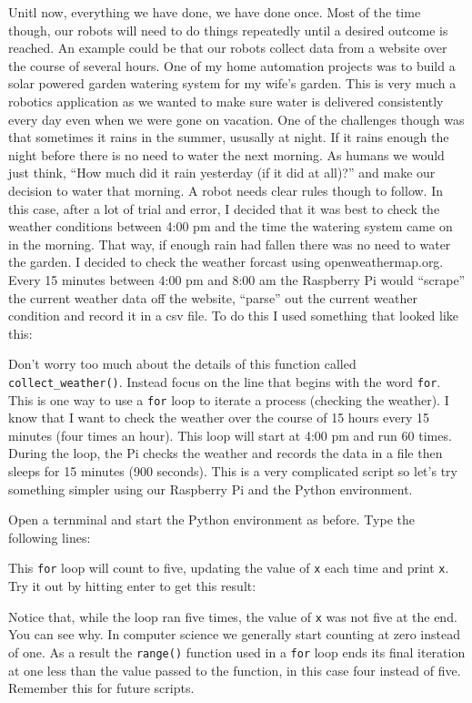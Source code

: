 \documentclass[
]{book}
\begin{document}
Unitl now, everything we have done, we have done once. Most of the time though, our robots will need to do things repeatedly until a desired outcome is reached. An example could be that our robots collect data from a website over the course of several hours. One of my home automation projects was to build a solar powered garden watering system for my wife's garden. This is very much a robotics application as we wanted to make sure water is delivered consistently every day even when we were gone on vacation. One of the challenges though was that sometimes it rains in the summer, ususally at night. If it rains enough the night before there is no need to water the next morning. As humans we would just think, ``How much did it rain yesterday (if it did at all)?'' and make our decision to water that morning. A robot needs clear rules though to follow. In this case, after a lot of trial and error, I decided that it was best to check the weather conditions between 4:00 pm and the time the watering system came on in the morning. That way, if enough rain had fallen there was no need to water the garden. I decided to check the weather forcast using openweathermap.org. Every 15 minutes between 4:00 pm and 8:00 am the Raspberry Pi would ``scrape'' the current weather data off the website, ``parse'' out the current weather condition and record it in a csv file. To do this I used something that looked like this:

Don't worry too much about the details of this function called \texttt{collect\_weather()}. Instead focus on the line that begins with the word \texttt{for}. This is one way to use a \texttt{for} loop to iterate a process (checking the weather). I know that I want to check the weather over the course of 15 hours every 15 minutes (four times an hour). This loop will start at 4:00 pm and run 60 times. During the loop, the Pi checks the weather and records the data in a file then sleeps for 15 minutes (900 seconds). This is a very complicated script so let's try something simpler using our Raspberry Pi and the Python environment.

Open a ternminal and start the Python environment as before. Type the following lines:

This \texttt{for} loop will count to five, updating the value of \texttt{x} each time and print \texttt{x}. Try it out by hitting enter to get this result:

Notice that, while the loop ran five times, the value of \texttt{x} was not five at the end. You can see why. In computer science we generally start counting at zero instead of one. As a result the \texttt{range()} function used in a \texttt{for} loop ends its final iteration at one less than the value passed to the function, in this case four instead of five. Remember this for future scripts.
\end{document}
